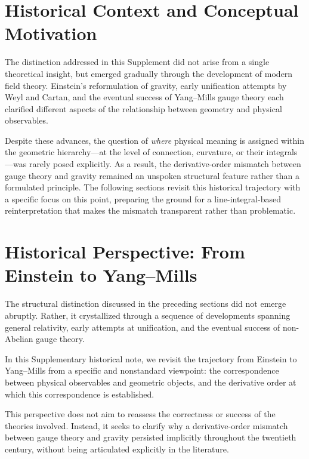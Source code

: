\documentclass[12pt,letterpaper]{article}
\begin{document}
\section{Historical Context and Conceptual Motivation}

\justifying
The distinction addressed in this Supplement did not arise from a single theoretical insight, but emerged gradually through the development of modern field theory. Einstein's reformulation of gravity, early unification attempts by Weyl and Cartan, and the eventual success of Yang--Mills gauge theory each clarified different aspects of the relationship between geometry and physical observables.

Despite these advances, the question of \emph{where} physical meaning is assigned within the geometric hierarchy---at the level of connection, curvature, or their integrals---was rarely posed explicitly. As a result, the derivative-order mismatch between gauge theory and gravity remained an unspoken structural feature rather than a formulated principle. The following sections revisit this historical trajectory with a specific focus on this point, preparing the ground for a line-integral-based reinterpretation that makes the mismatch transparent rather than problematic.

\section{Historical Perspective: From Einstein to Yang--Mills}

\justifying
The structural distinction discussed in the preceding sections did not emerge abruptly. Rather, it crystallized through a sequence of developments spanning general relativity, early attempts at unification, and the eventual success of non-Abelian gauge theory.

In this Supplementary historical note, we revisit the trajectory from Einstein to Yang--Mills from a specific and nonstandard viewpoint: the correspondence between physical observables and geometric objects, and the derivative order at which this correspondence is established.

This perspective does not aim to reassess the correctness or success of the theories involved. Instead, it seeks to clarify why a derivative-order mismatch between gauge theory and gravity persisted implicitly throughout the twentieth century, without being articulated explicitly in the literature.
\end{document}
